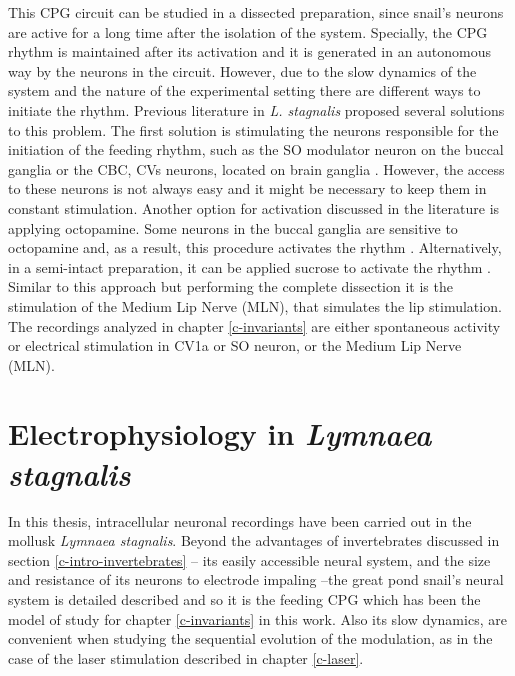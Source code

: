 This CPG circuit can be studied in a dissected preparation, since snail's neurons are active for a long time after the isolation of the system. Specially, the CPG rhythm is maintained after its activation and it is generated in an autonomous way by the neurons in the circuit. However, due to the slow dynamics of the system and the nature of the experimental setting there are different ways to initiate the rhythm. Previous literature in \textit{L. stagnalis} proposed several solutions to this problem. The first solution is stimulating the neurons responsible for the initiation of the feeding rhythm, such as the SO modulator neuron on the buccal ganglia or the CBC, CVs neurons, located on brain ganglia \parencite{benjamin_distributed_2012}. However, the access to these neurons is not always easy and it might be necessary to keep them in constant stimulation. Another option for activation discussed in the literature is applying octopamine. Some neurons in the buccal ganglia are sensitive to octopamine and, as a result, this procedure activates the rhythm \parencite{vehovszky_octopaminecontaining_2004}. Alternatively, in a semi-intact preparation, it can be applied sucrose to activate the rhythm \parencite{vavoulis_dynamic_2007,vehovszky_octopaminecontaining_2004,straub_endogenous_2002}. Similar to this approach but performing the complete dissection it is the stimulation of the Medium Lip Nerve (MLN), that simulates the lip stimulation. 
The recordings analyzed in chapter \ref{c-invariants} are either spontaneous activity or electrical stimulation in CV1a or SO neuron, or the Medium Lip Nerve (MLN).

\section{Electrophysiology in \textit{Lymnaea stagnalis}}

\label{subsec:preparation}
In this thesis, intracellular neuronal recordings have been carried out in the mollusk \textit{Lymnaea stagnalis}. Beyond the advantages of invertebrates discussed in section \ref{c-intro-invertebrates} -- its easily accessible neural system, and the size and resistance of its neurons to electrode impaling --the great pond snail's neural system is detailed described and so it is the feeding CPG which has been the model of study for chapter \ref{c-invariants} in this work. Also its slow dynamics, are convenient when studying the sequential evolution of the modulation, as in the case of the laser stimulation described in chapter \ref{c-laser}. 

